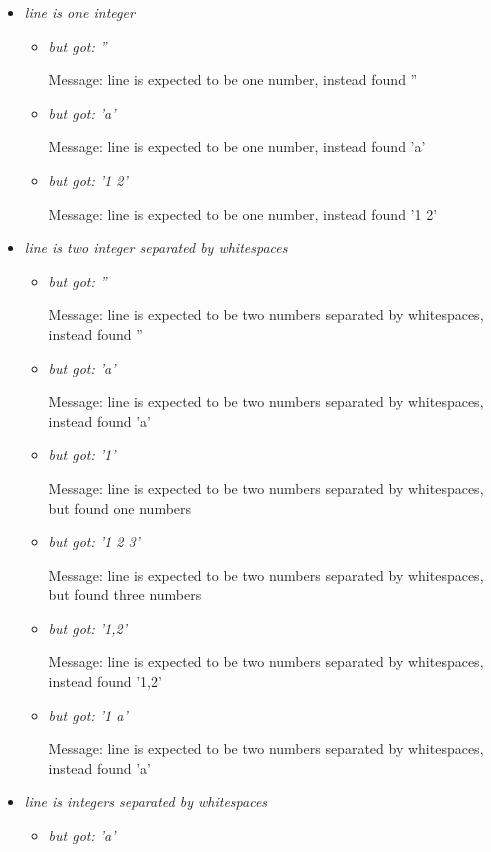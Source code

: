 \documentclass[11pt]{article}
\begin{document}
\begin{itemize}

\item \textit{line is one integer}
\begin{itemize}
\item \textit{but got: ''}

Message: line is expected to be one number, instead found ''

\item \textit{but got: 'a'}

Message: line is expected to be one number, instead found 'a'

\item \textit{but got: '1 2'}

Message: line is expected to be one number, instead found '1 2'
\end{itemize}

\item \textit{line is two integer separated by whitespaces}
\begin{itemize}
\item \textit{but got: ''}

Message: line is expected to be two numbers separated by whitespaces, instead found ''

\item \textit{but got: 'a'}

Message: line is expected to be two numbers separated by whitespaces, instead found 'a'

\item \textit{but got: '1'}

Message: line is expected to be two numbers separated by whitespaces, but found one numbers

\item \textit{but got: '1 2 3'}

Message: line is expected to be two numbers separated by whitespaces, but found three numbers

\item \textit{but got: '1,2'}

Message: line is expected to be two numbers separated by whitespaces, instead found '1,2'

\item \textit{but got: '1 a'}

Message: line is expected to be two numbers separated by whitespaces, instead found 'a'
\end{itemize}

\item \textit{line is integers separated by whitespaces}
\begin{itemize}
\item \textit{but got: 'a'}


\end{itemize}
\end{itemize}
\end{document}
